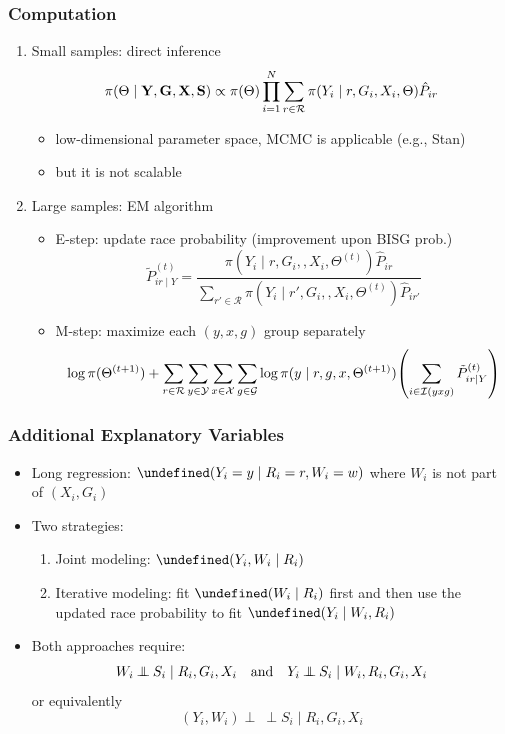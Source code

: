 \documentclass[handout]{beamer}
\let\Pr\undefined
\DeclareMathOperator{\Pr}{\mathbb{P}}
\newcommand{\indep}{\mathbin{\perp\!\!\!\!\!\:\perp}}
\newcommand{\cR}{\mathcal{R}}
\newcommand{\cG}{\mathcal{G}}
\newcommand{\cX}{\mathcal{X}}
\newcommand{\cY}{\mathcal{Y}}
\newcommand{\cI}{\mathcal{I}}
\begin{document}
\begin{frame}

  \frametitle{Computation}

  \begin{enumerate}
  \item Small samples: \alert{direct inference}
$$
    \pi(\Theta\mid \vb Y, \vb G, \vb X, \vb S)
    \propto \pi(\Theta) \prod_{i=1}^N \sum_{r\in\cR} \pi(Y_i\mid 
    r, G_i, X_i, \Theta)\hat{P}_{ir}
    $$
    \begin{itemize}
    \item low-dimensional parameter space, MCMC is applicable (e.g.,
      Stan)
    \item but it is not scalable
    \end{itemize}
    
  \item Large samples: \alert{EM algorithm}
    \begin{itemize}
    \item E-step: update race probability (improvement upon BISG prob.)
      $$\tilde{P}_{ir\mid Y}^{(t)}
    = \frac{\pi(Y_i\mid r, G_i,, X_i, \Theta^{(t)}) \hat P_{ir}}{
        \sum_{r'\in\cR} \pi(Y_i\mid r', G_i,, X_i, \Theta^{(t)}) \hat P_{ir'} }$$
    \item M-step: maximize each $(y,x,g)$ group separately
      $$\log \pi(\Theta^{(t+1)}) + \sum_{r\in\cR}\sum_{y\in\cY}\sum_{x\in\cX}\sum_{g\in\cG} 
        \log \pi(y\mid r, g, x, \Theta^{(t+1)}) 
        \qty(\sum_{i\in\cI(yxg)} \tilde{P}_{ir\mid Y}^{(t)}) $$
    \end{itemize}

  \end{enumerate}

\end{frame}

\begin{frame}

  \frametitle{Additional Explanatory Variables}

  \begin{itemize}
  \item Long regression: $\Pr(Y_i  = y \mid R_i = r, W_i = w)$ where
    $W_i$ is not part of $(X_i, G_i)$
\vfill
  \item Two strategies:
    \begin{enumerate}
    \item Joint modeling: $\Pr(Y_i, W_i \mid R_i)$
    \item Iterative modeling: fit $\Pr(W_i \mid R_i)$ first and then use the
      updated race probability to fit $\Pr(Y_i \mid W_i, R_i)$
    \end{enumerate}
\vfill
\item Both approaches require:
   $$W_i\indep S_i\mid R_i,G_i,X_i \qand
   Y_i\indep S_i\mid W_i,R_i,G_i,X_i$$
   or equivalently
   $$(Y_i, W_i)\indep S_i\mid R_i,G_i,X_i$$
   \vspace{-.4in}
  \end{itemize}

\end{frame}
\end{document}
